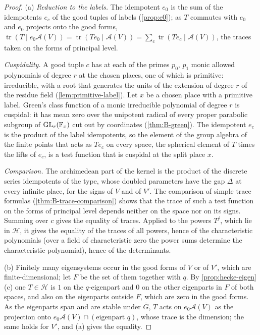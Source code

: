 \begin{proof}
(a) \emph{Reduction to the labels.} The idempotent $e_0$ is the sum of the idempotents $e_c$ of the good tuples of labels (\cref{prop:e0}); as $T$ commutes with $e_0$ and $e_0$ projects onto the good forms, $\operatorname{tr}(T\mid e_0\mathcal A(V))=\operatorname{tr}(Te_0\mid\mathcal A(V))=\sum_c\operatorname{tr}(Te_c\mid\mathcal A(V))$, the traces taken on the forms of principal level.

\emph{Cuspidality.} A good tuple $c$ has at each of the primes $p_0$, $p_1$ monic allowed polynomials of degree $r$ at the chosen places, one of which is primitive: irreducible, with a root that generates the units of the extension of degree $r$ of the residue field (\cref{lem:primitive-label}). Let $x$ be a chosen place with a primitive label. Green's class function of a monic irreducible polynomial of degree $r$ is cuspidal: it has mean zero over the unipotent radical of every
proper parabolic subgroup of $\operatorname{GL}_r(\mathbb{F}_x)$ cut out by coordinates (\cref{thm:B-green}). The idempotent $e_c$ is the product of the label idempotents, so the element of the group algebra of the finite points that acts as $Te_c$ on every space, the spherical element of $T$ times the lifts of $e_c$, is a test function that is cuspidal at the split place $x$.

\emph{Comparison.} The archimedean part of the kernel is the product of the discrete series idempotents of the type, whose doubled parameters have the gap $\Delta$ at every infinite place, for the signs of $V$ and of $V'$. The comparison of simple trace formulas (\cref{thm:B-trace-comparison}) shows that the trace of such a test function on the forms of principal level depends neither on the space nor on its signs. Summing over $c$ gives the equality of traces. Applied to the powers
$T^j$, which lie in $\mathcal H$, it gives the equality of the traces of all powers, hence of the characteristic polynomials (over a field of characteristic zero the power sums determine the characteristic polynomial), hence of the determinants.

(b) Finitely many eigensystems occur in the good forms of $V$ or of $V'$, which are finite-dimensional; let $F$ be the set of them together with $q$. By \cref{prop:hecke-eigen}(c) one $T\in\mathcal H$ is $1$ on the $q$-eigenpart and $0$ on the other eigenparts in $F$ of both spaces, and also on the eigenparts outside $F$, which are zero in the good forms. As the eigenparts span and are stable under $\bar G$, $T$ acts on $e_0\mathcal A(V)$ as the projection onto
$e_0\mathcal A(V)\cap(\text{eigenpart }q)$, whose trace is the dimension; the same holds for $V'$, and (a) gives the equality.


\end{proof}
